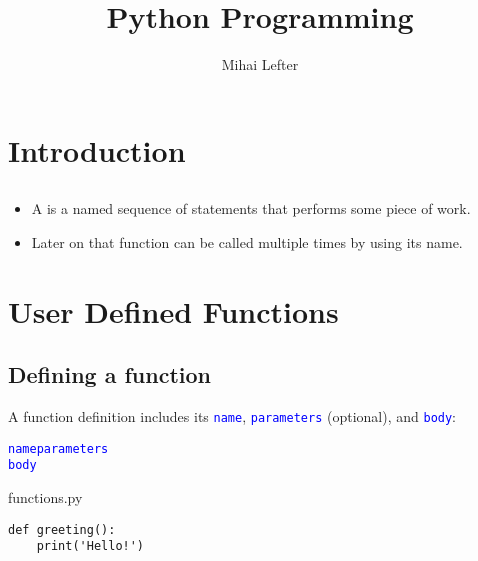 \documentclass[aspectratio=1610,slidestop]{beamer}
\author{Mihai Lefter}
\title{Python Programming}
\newcommand{\decl}[1]{\textcolor{blue}{\lstinline{#1}}}
\begin{document}

\makeTitleSlide{}


\section{Introduction}

\begin{pframe}
 \begin{center}
  
 \end{center}
\end{pframe}


\begin{pframe}
 \begin{center}
  
 \end{center}
\end{pframe}

\makeTableOfContents

\subsection{ }
\begin{pframe}
 \begin{itemize}
  \item A  is a named sequence of statements that performs some
        piece of work.
  \item Later on that function can be called multiple times by using its name.
 \end{itemize}
\end{pframe}


\section{User Defined Functions}

\subsection{Defining a function}
\begin{pframe}
 A function definition includes its \decl{name}, \decl{parameters} (optional), and \decl{body}:
 \begin{pythondeclaration}
  \textvisiblespace\decl{name}\emp{(}\decl{parameters}\emp{):}\\
  \textvisiblespace\textvisiblespace\textvisiblespace\textvisiblespace\decl{body}
 \end{pythondeclaration}
 \pause
 \begin{pythonfile}{functions.py}
  \begin{verbatim}
def greeting():
    print('Hello!')
  \end{verbatim}
 \end{pythonfile}
\end{pframe}
\end{document}
